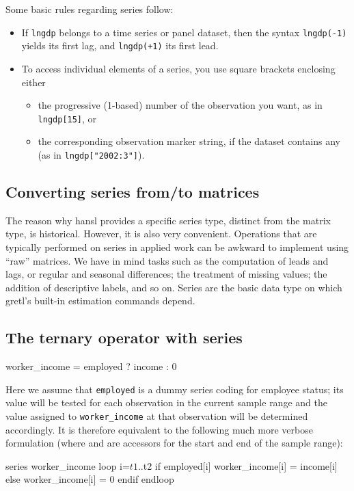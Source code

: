 Some basic rules regarding series follow:
\begin{itemize}
\item If \texttt{lngdp} belongs to a time series or panel dataset,
  then the syntax \texttt{lngdp(-1)} yields its first lag, and
  \texttt{lngdp(+1)} its first lead.
\item To access individual elements of a series, you use square
  brackets enclosing either
  \begin{itemize}
  \item the progressive (1-based) number of the observation you want,
    as in \verb|lngdp[15]|, or
  \item the corresponding observation marker string, if the dataset
    contains any (as in \verb|lngdp["2002:3"]|).
  \end{itemize}
\end{itemize}

\subsection{Converting series from/to matrices}

The reason why hansl provides a specific series type, distinct from
the matrix type, is historical. However, it is also very convenient.
Operations that are typically performed on series in applied work can
be awkward to implement using ``raw'' matrices. We have in mind tasks
such as the computation of leads and lags, or regular and seasonal
differences; the treatment of missing values; the addition of
descriptive labels, and so on. Series are the basic data type on which
gretl's built-in estimation commands depend.

\subsection{The ternary operator with series}

\begin{code}
  worker_income = employed ? income : 0
\end{code}

Here we assume that \texttt{employed} is a dummy series coding for
employee status; its value will be tested for each observation in the
current sample range and the value assigned to \texttt{worker\_income}
at that observation will be determined accordingly. It is therefore
equivalent to the following much more verbose formulation (where
 and  are accessors for the start and end of the
sample range):
\begin{code}
series worker_income
loop i=$t1..$t2
    if employed[i]
        worker_income[i] = income[i]
    else
        worker_income[i] = 0
    endif
endloop
\end{code}

